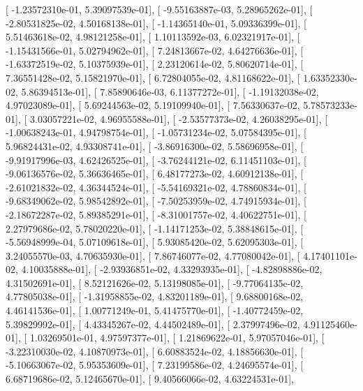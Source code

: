 \documentclass{article}
\begin{document}
       [ -1.23572310e-01,   5.39097539e-01],
       [ -9.55163887e-03,   5.28965262e-01],
       [ -2.80531825e-02,   4.50168138e-01],
       [ -1.14365140e-01,   5.09336399e-01],
       [  5.51463618e-02,   4.98121258e-01],
       [  1.10113592e-03,   6.02321917e-01],
       [ -1.15431566e-01,   5.02794962e-01],
       [  7.24813667e-02,   4.64276636e-01],
       [ -1.63372519e-02,   5.10375939e-01],
       [  2.23120614e-02,   5.80620714e-01],
       [  7.36551428e-02,   5.15821970e-01],
       [  6.72804055e-02,   4.81168622e-01],
       [  1.63352330e-02,   5.86394513e-01],
       [  7.85890646e-03,   6.11377272e-01],
       [ -1.19132038e-02,   4.97023089e-01],
       [  5.69244563e-02,   5.19109940e-01],
       [  7.56330637e-02,   5.78573233e-01],
       [  3.03057221e-02,   4.96955588e-01],
       [ -2.53577373e-02,   4.26038295e-01],
       [ -1.00638243e-01,   4.94798754e-01],
       [ -1.05731234e-02,   5.07584395e-01],
       [  5.96824431e-02,   4.93308741e-01],
       [ -3.86916300e-02,   5.58696958e-01],
       [ -9.91917996e-03,   4.62426525e-01],
       [ -3.76244121e-02,   6.11451103e-01],
       [ -9.06136576e-02,   5.36636465e-01],
       [  6.48177273e-02,   4.60912138e-01],
       [ -2.61021832e-02,   4.36344524e-01],
       [ -5.54169321e-02,   4.78860834e-01],
       [ -9.68349062e-02,   5.98542892e-01],
       [ -7.50253959e-02,   4.74915934e-01],
       [ -2.18672287e-02,   5.89385291e-01],
       [ -8.31001757e-02,   4.40622751e-01],
       [  2.27979686e-02,   5.78020220e-01],
       [ -1.14171253e-02,   5.38848615e-01],
       [ -5.56948999e-04,   5.07109618e-01],
       [  5.93085420e-02,   5.62095303e-01],
       [  3.24055570e-03,   4.70635930e-01],
       [  7.86746077e-02,   4.77080042e-01],
       [  4.17401101e-02,   4.10035888e-01],
       [ -2.93936851e-02,   4.33293935e-01],
       [ -4.82898886e-02,   4.31502691e-01],
       [  8.52121626e-02,   5.13198085e-01],
       [ -9.77064135e-02,   4.77805038e-01],
       [ -1.31958855e-02,   4.83201189e-01],
       [  9.68800168e-02,   4.46141536e-01],
       [  1.00771249e-01,   5.41475770e-01],
       [ -1.40772459e-02,   5.39829992e-01],
       [  4.43345267e-02,   4.44502489e-01],
       [  2.37997496e-02,   4.91125460e-01],
       [  1.03269501e-01,   4.97597377e-01],
       [  1.21869622e-01,   5.97057046e-01],
       [ -3.22310030e-02,   4.10870973e-01],
       [  6.60883524e-02,   4.18856630e-01],
       [ -5.10663067e-02,   5.95353609e-01],
       [  7.23199586e-02,   4.24695574e-01],
       [  6.68719686e-02,   5.12465670e-01],
       [  9.40566066e-02,   4.63224531e-01],
\end{document}
